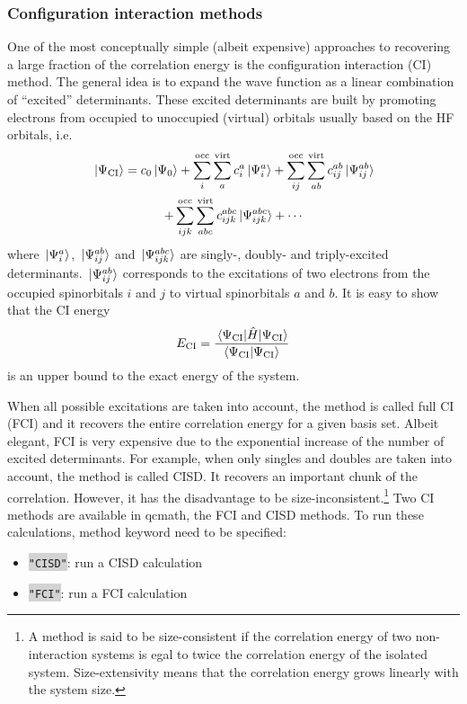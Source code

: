 \documentclass[aip,jcp,reprint,noshowkeys,superscriptaddress]{revtex4-1}
\newcommand{\keyword}[1]{{\colorbox{lightgray}{\texttt{#1}}}}
\begin{document}
\subsubsection*{Configuration interaction methods}
One of the most conceptually simple (albeit expensive) approaches to recovering a large fraction of the correlation energy is the configuration interaction (CI) method. \cite{SzaboBook,JensenBook,HelgakerBook}
The general idea is to expand the wave function as a linear combination of ``excited'' determinants.
These excited determinants are built by promoting electrons from occupied to unoccupied (virtual) orbitals usually based on the HF orbitals, i.e.
\begin{multline} 
\label{eq:Psi-CI}
	\ket*{\Psi_\text{CI}}	= 					c_0 	\ket*{\Psi_0} 
		+ \sum_i^{\text{occ}} \sum_a^{\text{virt}} 		c_{i}^{a} 	\ket*{\Psi_{i}^{a}} 
		+ \sum_{ij}^{\text{occ}} \sum_{ab}^{\text{virt}} 	c_{ij}^{ab} 	\ket*{\Psi_{ij}^{ab}}
		\\
		+ \sum_{ijk}^{\text{occ}} \sum_{abc}^{\text{virt}}	c_{ijk}^{abc} 	\ket*{\Psi_{ijk}^{abc}}
		+ \cdots
\end{multline}
where $\ket*{\Psi_{i}^{a}}$, $\ket*{\Psi_{ij}^{ab}}$ and $\ket*{\Psi_{ijk}^{abc}}$ are singly-, doubly- and triply-excited determinants.
$\ket*{\Psi_{ij}^{ab}}$ corresponds to the excitations of two electrons from the occupied spinorbitals $i$ and $j$ to virtual spinorbitals $a$ and $b$. 
It is easy to show that the CI energy
\begin{equation}
	E_\text{CI} = \frac{\mel{\Psi_\text{CI}}{\Hat{H}}{\Psi_\text{CI}}}{\braket{\Psi_\text{CI}}{\Psi_\text{CI}}}
\end{equation}
is an upper bound to the exact energy of the system.

When all possible excitations are taken into account, the method is called full CI (FCI) and it recovers the entire correlation energy for a given basis set.
Albeit elegant, FCI is very expensive due to the exponential increase of the number of excited determinants.
For example, when only singles and doubles are taken into account, the method is called CISD. 
It recovers an important chunk of the correlation.
However, it has the disadvantage to be size-inconsistent.\footnote{A method is said to be size-consistent if the correlation energy of two non-interaction systems is egal to twice the correlation energy of the isolated system.
Size-extensivity means that the correlation energy grows linearly with the system size.}
Two CI methods are available in qcmath, the FCI and CISD methods. To run these calculations, method keyword need to be specified:
\begin{itemize}
\item \keyword{"CISD"}: run a CISD calculation
\item \keyword{"FCI"}: run a FCI calculation
\end{itemize}
\end{document}
